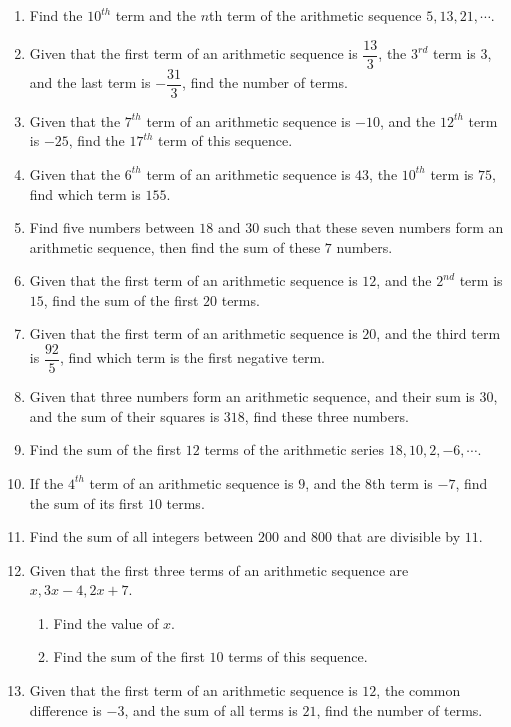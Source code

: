 \documentclass{report}
\begin{document}
    \begin{enumerate}
        \item Find the $10^{th}$ term and the $n$th term of the arithmetic sequence $5, 13, 21, \cdots$.
        \item Given that the first term of an arithmetic sequence is $\dfrac{13}{3}$, the $3^{rd}$ term is $3$, and the last term is $-\dfrac{31}{3}$, find the number of terms.
        \item Given that the $7^{th}$ term of an arithmetic sequence is $-10$, and the $12^{th}$ term is $-25$, find the $17^{th}$ term of this sequence.
        \item Given that the $6^{th}$ term of an arithmetic sequence is $43$, the $10^{th}$ term is $75$, find which term is $155$.
        \item Find five numbers between $18$ and $30$ such that these seven numbers form an arithmetic sequence, then find the sum of these $7$ numbers.
        \item Given that the first term of an arithmetic sequence is $12$, and the $2^{nd}$ term is $15$, find the sum of the first $20$ terms.
        \item Given that the first term of an arithmetic sequence is $20$, and the third term is $\dfrac{92}{5}$, find which term is the first negative term.
        \item Given that three numbers form an arithmetic sequence, and their sum is $30$, and the sum of their squares is $318$, find these three numbers.
        \item Find the sum of the first $12$ terms of the arithmetic series $18, 10, 2, -6, \cdots$.
        \item  If the $4^{th}$ term of an arithmetic sequence is $9$, and the 8th term is $-7$, find the sum of its first $10$ terms.
        \item  Find the sum of all integers between $200$ and $800$ that are divisible by $11$.
        \item  Given that the first three terms of an arithmetic sequence are $x, 3x-4, 2x+7$.
        \begin{enumerate}
            \item Find the value of $x$.
            \item Find the sum of the first $10$ terms of this sequence.
        \end{enumerate}
        \item Given that the first term of an arithmetic sequence is $12$, the common difference is $-3$, and the sum of all terms is $21$, find the number of terms.

\end{enumerate}
\end{document}
